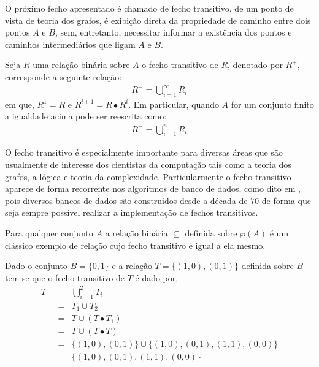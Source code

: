 O próximo fecho apresentado é chamado de fecho transitivo, de um ponto de vista de teoria dos grafos, é exibição direta da propriedade de caminho entre dois pontos $A$ e $B$, sem, entretanto, necessitar informar a existência dos pontos e caminhos intermediários que ligam $A$ e $B$.

\begin{definicao}\label{def:FechoTransitivo}
	Seja $R$ uma relação binária sobre $A$ o fecho transitivo de $R$, denotado por $R^+$, corresponde a seguinte relação:
	\begin{eqnarray*}
		R^+ = \bigcup_{i = 1}^\infty R_i
	\end{eqnarray*}
	em que, $R^1 = R$ e $R^{i+1} = R \bullet R^i$. Em particular, quando $A$ for um conjunto finito a igualdade acima pode ser reescrita como:
	\begin{eqnarray*}
		R^+ = \bigcup_{i = 1}^n R_i
	\end{eqnarray*}
\end{definicao}

O fecho transitivo é especialmente importante para diversas áreas que são usualmente de interesse dos cientistas da computação tais como a teoria dos grafos, a lógica e teoria da complexidade. Particularmente o fecho transitivo aparece de forma recorrente nos algoritmos de banco de dados, como dito em \cite{Gerard2021discreta}, pois diversos bancos de dados são construídos desde a década de 70 de forma que seja sempre possível realizar a implementação de fechos transitivos.

\begin{exemplo}
	Para qualquer conjunto $A$ a relação binária $\subseteq$ definida sobre $\wp(A)$ é um clássico exemplo de relação cujo fecho transitivo é igual a ela mesmo.
\end{exemplo}

\begin{exemplo}
	Dado o conjunto $B = \{0,1\}$ e a relação $T = \{(1, 0), (0, 1)\}$ definida sobre $B$ tem-se que o fecho transitivo de $T$ é dado por, 
	\begin{eqnarray*}
		T^+ & = & \bigcup_{i = 1}^2 T_i\\
		& = & T_1 \cup T_2\\
		& = & T \cup (T \bullet T_1)\\
		& = & T \cup (T \bullet T)\\
		& = &  \{(1, 0), (0, 1)\} \cup  \{(1, 0), (0, 1), (1, 1), (0, 0)\}\\
		& = &  \{(1, 0), (0, 1), (1, 1), (0, 0)\}\\
	\end{eqnarray*}
\end{exemplo}

